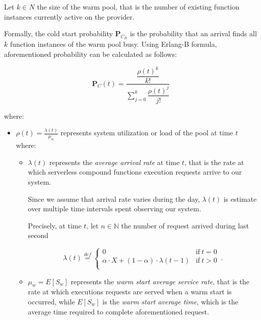 \documentclass[12pt,a4paper]{report}
\newcommand*{\N}{\mathbb{N}}
\newcommand{\mathDef}{\overset{\textit{def}}{=}}
\theoremstyle{definition}
\begin{document}
Let $k \in N$ the size of the warm pool, that is the number of existing function instances currently active on the provider.

Formally, the cold start probability $\textbf{P}_{C_R}$ is the probability that an arrival finds all $k$ function instances of the warm pool busy. Using Erlang-B formula, aforementioned probability can be calculated as follows:

\begin{equation}
	\displaystyle \textbf{P}_{C}(t) = \dfrac{\dfrac{\rho(t)^k}{k!}}{\displaystyle\sum_{j=0}^k \dfrac{\rho(t)^j}{j!}}
\end{equation}

where:

\begin{itemize}
	
	\item $\displaystyle \rho(t) = \frac{\lambda(t)}{\mu_{w}}$ represents system utilization or load of the pool at time $t$ where:
	
	\begin{itemize}
		
		\item $\lambda(t)$ represents the \textit{average arrival rate} at time $t$, that is the  rate at which serverless compound functions execution requests arrive to our system.
		
		Since we assume that arrival rate varies during the day, $\lambda(t)$ is estimate over multiple time intervals spent observing our system.
		
		Precisely, at time $t$, let $n \in \N$ the number of request arrived during last second 
		
		\begin{equation}
			\lambda(t) \mathDef
			\begin{cases}
				0 & \text{if}\ t = 0\\ 
				\alpha \cdot X + (1 - \alpha) \cdot \lambda(t-1) & \text{if}\ t > 0\\
				
			\end{cases}\,.
		\end{equation}
		
		\item $\mu_{w} = E[S_w]$ represents the \textit{warm start average service rate}, that is the rate at which executions requests are served when a warm start is occurred, while $E[S_w]$ is the \textit{warm start average time}, which is the average time required to complete aforementioned request.
		
	\end{itemize}
	
\end{itemize}
\end{document}
